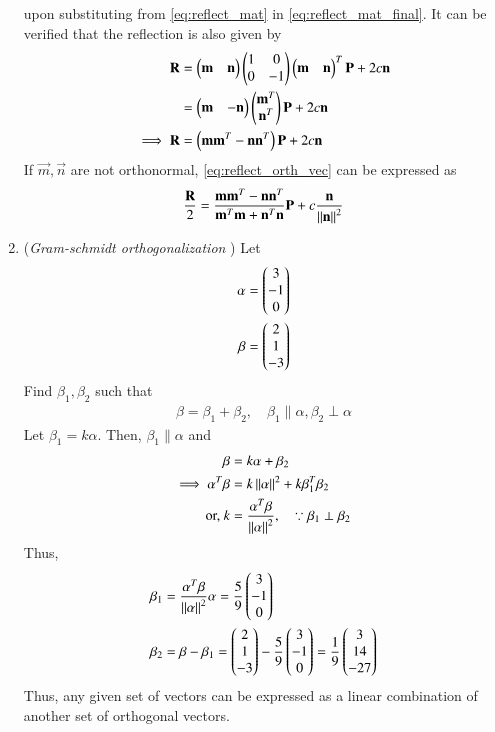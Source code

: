 \begin{enumerate}[label=\thesection.\arabic*.,ref=\thesection.\theenumi]
upon substituting from \eqref{eq:reflect_mat} in \eqref{eq:reflect_mat_final}.
It can be verified that 
the reflection is also given by
\begin{align}
\mathbf{R} &= \begin{pmatrix}\mathbf{m} & \mathbf{n}\end{pmatrix}\begin{pmatrix}1 & 0 \\ 0 & -1\end{pmatrix}\begin{pmatrix}\mathbf{m} & \mathbf{n}\end{pmatrix}^T \mathbf{P}+2c \mathbf{n}
\\
 &= \begin{pmatrix}\mathbf{m} & -\mathbf{n}\end{pmatrix}\begin{pmatrix}\mathbf{m}^T \\ \mathbf{n}^T\end{pmatrix} \mathbf{P}+2c \mathbf{n}
\\
\implies \mathbf{R}&= \left(\mathbf{m}\mathbf{m}^T-\mathbf{n}\mathbf{n}^T\right)\mathbf{P} + 2c \mathbf{n} 
\label{eq:reflect_orth_vec}
\end{align}
If $\vec{m}, \vec{n}$ are not orthonormal, \eqref{eq:reflect_orth_vec}
can be expressed as
\begin{align}
 \frac{\mathbf{R}}{2}= \frac{\mathbf{m}\mathbf{m}^T-\mathbf{n}\mathbf{n}^T}{\mathbf{m}^T\mathbf{m}+\mathbf{n}^T\mathbf{n}}\mathbf{P} + c \frac{\mathbf{n}}{\left\lVert\mathbf{n}\right\rVert^2}
\label{eq:reflect_non_orth_vec}
\end{align}
\item ({\em Gram-schmidt orthogonalization }) Let 
\begin{align}
{\alpha} &= \begin{pmatrix}3\\-1\\0\end{pmatrix}
\\
 {\beta} &= \begin{pmatrix}2\\1\\-3\end{pmatrix}
\end{align}
Find ${\beta}_1, {\beta}_2 $ such 
that 
\begin{align}
{\beta}={\beta}_1+{\beta}_2, \quad {\beta}_1 \parallel  {\alpha},{\beta}_2 \perp {\alpha} 
\end{align}
%
\label{prob:line_gram_schmidt}
\solution Let ${\beta}_1 = k{\alpha}$.  Then, ${\beta}_1 \parallel {\alpha}$ and 
%
\begin{align}
{\beta} &= k{\alpha}+{\beta}_2
\\
\implies {\alpha}^T{\beta} &= k\left\lVert\alpha\right\rVert^2+k{\beta}_1^T{\beta}_2
\\
\text{or, } k &= \frac{{\alpha}^T{\beta}}{\left\lVert{\alpha}\right\rVert^2}, \quad \because {\beta}_1 \perp {\beta}_2
\end{align}
%
Thus,
%
\begin{align}
{\beta}_1 &= \frac{{\alpha}^T{\beta}}{\left\lVert{\alpha}\right\rVert^2}{\alpha} = \frac{5}{9}\begin{pmatrix}3\\-1\\0\end{pmatrix}
\\
{\beta}_2 &= {\beta}-{\beta}_1 = \begin{pmatrix}2\\1\\-3\end{pmatrix}- \frac{5}{9}\begin{pmatrix}3\\-1\\0\end{pmatrix} = \frac{1}{9}\begin{pmatrix}3\\14\\-27\end{pmatrix}
\end{align}
%
Thus, any given set of vectors can be expressed as a linear combination of another set of orthogonal vectors.  

\end{enumerate}
